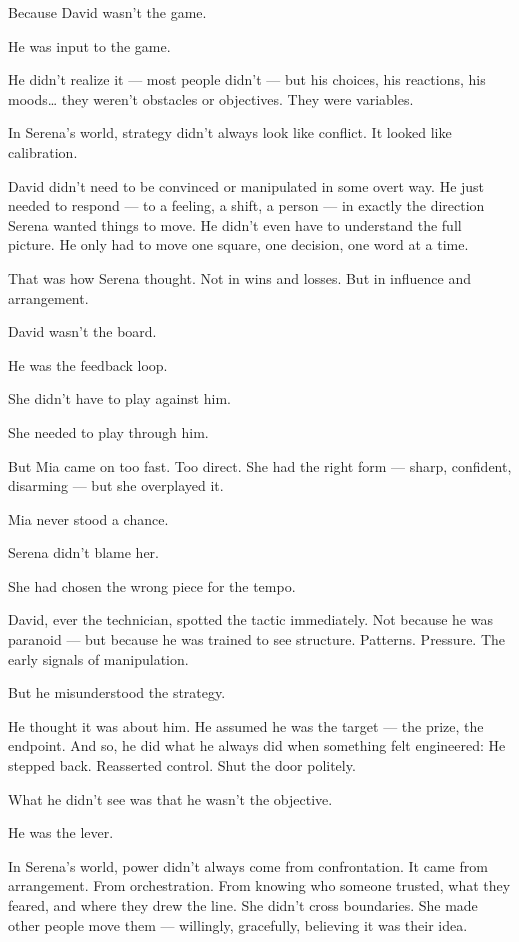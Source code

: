 Because David wasn’t the game.

He was input to the game.

He didn’t realize it — most people didn’t — but his choices, his reactions, his moods…
they weren’t obstacles or objectives.
They were variables.

In Serena’s world, strategy didn’t always look like conflict.
It looked like calibration.

David didn’t need to be convinced or manipulated in some overt way.
He just needed to respond — to a feeling, a shift, a person — in exactly the direction Serena wanted things to move.
He didn’t even have to understand the full picture.
He only had to move one square, one decision, one word at a time.

That was how Serena thought.
Not in wins and losses.
But in influence and arrangement.

David wasn’t the board.

He was the feedback loop.

She didn’t have to play against him.

She needed to play through him.

But Mia came on too fast. Too direct.
She had the right form — sharp, confident, disarming — but she overplayed it.

Mia never stood a chance.

Serena didn’t blame her.

She had chosen the wrong piece for the tempo.

David, ever the technician, spotted the tactic immediately.
Not because he was paranoid — but because he was trained to see structure.
Patterns. Pressure. The early signals of manipulation.

But he misunderstood the strategy.

He thought it was about him.
He assumed he was the target — the prize, the endpoint.
And so, he did what he always did when something felt engineered:
He stepped back. Reasserted control. Shut the door politely.

What he didn’t see was that he wasn’t the objective.

He was the lever.

In Serena’s world, power didn’t always come from confrontation.
It came from arrangement. From orchestration.
From knowing who someone trusted, what they feared, and where they drew the line.
She didn’t cross boundaries.
She made other people move them — willingly, gracefully, believing it was their idea.

